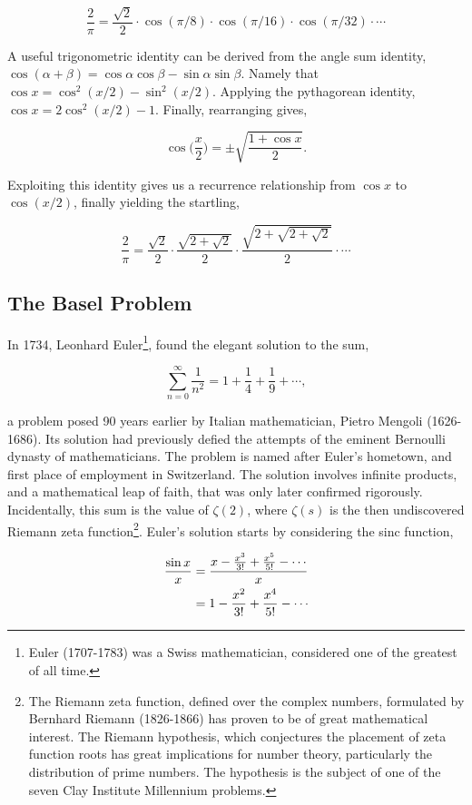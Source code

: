 \documentclass[11pt]{amsart}
\begin{document}
$$
\frac{2}{\pi} = \frac{\sqrt{2}}{2} \cdot \cos(\pi/8) \cdot \cos(\pi/16) \cdot \cos(\pi/32) \cdot \cdots
$$

A useful trigonometric identity can be derived from the angle sum identity, $\cos(\alpha + \beta) = \cos\alpha\cos\beta - \sin\alpha\sin\beta$. Namely that $\cos x = \cos^2(x/2) - \sin^2(x/2)$. Applying the pythagorean identity, $\cos x = 2\cos^2(x/2) - 1$. Finally, rearranging gives,

$$\cos \Big(\frac{x}{2}\Big) = \pm\sqrt{\frac{1 + \cos x}{2}}.$$

Exploiting this identity gives us a recurrence relationship from $\cos x$ to $\cos(x/2)$, finally yielding the startling,

$$
\frac{2}{\pi} = \frac{\sqrt{2}}{2} \cdot \frac{\sqrt{2 + \sqrt{2}}}{2} \cdot \frac{\sqrt{2 + \sqrt{2 + \sqrt{2}}}}{2} \cdot \cdots
$$

\subsection{The Basel Problem}
In 1734, Leonhard Euler\footnote{Euler (1707-1783) was a Swiss mathematician, considered one of the greatest of all time.}, found the elegant solution to the sum,

$$\sum_{n=0}^{\infty}\frac{1}{n^2} = 1 + \frac{1}{4} + \frac{1}{9} + \cdots,$$

a problem posed 90 years earlier by Italian mathematician, Pietro Mengoli (1626-1686). Its solution had previously defied the attempts of the eminent Bernoulli dynasty of mathematicians. The problem is named after Euler's hometown, and first place of employment in Switzerland. The solution involves infinite products, and a mathematical leap of faith, that was only later confirmed rigorously. Incidentally, this sum is the value of $\zeta(2)$, where $\zeta(s)$ is the then undiscovered Riemann zeta function\footnote{The Riemann zeta function, defined over the complex numbers, formulated by Bernhard Riemann (1826-1866) has proven to be of great mathematical interest. The Riemann hypothesis, which conjectures the placement of zeta function roots has great implications for number theory, particularly the distribution of prime numbers. The hypothesis is the subject of one of the seven Clay Institute Millennium problems.}. Euler's solution starts by considering the sinc function,

\begin{align}
\frac{\sin x}{x} &= \frac{ x - \frac{x^3}{3!} + \frac{x^5}{5!} - \cdots}{x}  \notag \\
&=  1 - \frac{x^2}{3!} + \frac{x^4}{5!} - \cdots \label{eq:sinx}
\end{align}
\end{document}
